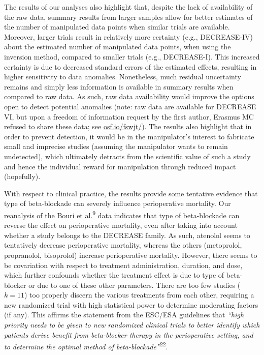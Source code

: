 \documentclass[]{article}
\begin{document}
The results of our analyses also highlight that, despite the lack of
availability of the raw data, summary results from larger samples allow
for better estimates of the number of manipulated data points when
similar trials are available. Moreover, larger trials result in
relatively more certainty (e.g., DECREASE-IV) about the estimated number
of manipulated data points, when using the inversion method, compared to
smaller trials (e.g., DECREASE-I). This increased certainty is due to
decreased standard errors of the estimated effects, resulting in higher
sensitivity to data anomalies. Nonetheless, much residual uncertainty
remains and simply less information is available in summary results when
compared to raw data. As such, raw data availability would improve the
options open to detect potential anomalies (note: raw data are available
for DECREASE VI, but upon a freedom of information request by the first
author, Erasmus MC refused to share these data; see
\href{https://osf.io/fswjt/}{osf.io/fswjt/}). The results also highlight
that in order to prevent detection, it would be in the manipulator's
interest to fabricate small and imprecise studies (assuming the
manipulator wants to remain undetected), which ultimately detracts from
the scientific value of such a study and hence the individual reward for
manipulation through reduced impact (hopefully).

With respect to clinical practice, the results provide some tentative
evidence that type of beta-blockade can severely influence perioperative
mortality. Our reanalysis of the Bouri et al.\textsuperscript{9} data
indicates that type of beta-blockade can reverse the effect on
perioperative mortality, even after taking into account whether a study
belongs to the DECREASE family. As such, atenolol seems to tentatively
decrease perioperative mortality, whereas the others (metoprolol,
propranolol, bisoprolol) increase perioperative mortality. However,
there seems to be covariation with respect to treatment administration,
duration, and dose, which further confounds whether the treatment effect
is due to type of beta-blocker or due to one of these other parameters.
There are too few studies (\(k=11\)) too properly discern the various
treatments from each other, requiring a new randomized trial with high
statistical power to determine moderating factors (if any). This affirms
the statement from the ESC/ESA guidelines that \emph{``high priority
needs to be given to new randomized clinical trials to better identify
which patients derive benefit from beta-blocker therapy in the
perioperative setting, and to determine the optimal method of
beta-blockade''}\textsuperscript{22}.
\end{document}
